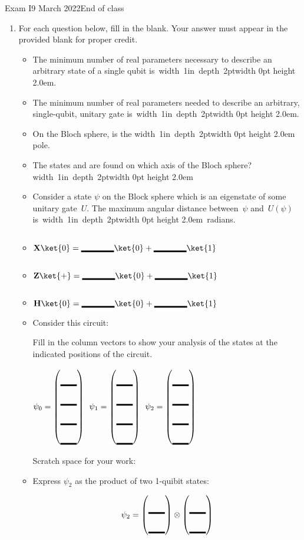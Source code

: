 \documentclass[12pt]{article}
\def\Gate#1{\textbf{#1}}
\def\X{\Gate{X}}
\def\Z{\Gate{Z}}
\def\H{\Gate{H}}
\def\QZero{\ket{0}}
\def\QState#1{\ensuremath{\psi_{#1}}}
\newcommand{\Blank}[1][1in]{\mbox{\vrule width #1 depth 2pt}\vrule width 0pt height 2.0em}
\def\BlQb{\mbox{\ensuremath{\Blank[4em]\ket{0}+\Blank[4em]\ket{1}}}}
\def\SQB#1#2{%
\ensuremath{%
\begin{pmatrix*}[r] #1 \\ #2\end{pmatrix*}}}
\def\SQBB{\SQB{\Blank[2em]}{\Blank[2em]}}
\def\DQB#1#2#3#4{%
\ensuremath{%
\begin{pmatrix*}[r] #1 \\ #2 \\ #3 \\ #4\end{pmatrix*}}}
\def\DQBB{\DQB{\Blank[2em]}{\Blank[2em]}{\Blank[2em]}{\Blank[2em]}}
\begin{document}
\begin{assignment}{Exam I}{9 March 2022}{End of class}
\begin{enumerate}
\item{} For each question below, fill in the blank.  Your answer must appear in the provided blank for proper credit.
\begin{itemize}
    \item The minimum number of real parameters necessary to describe an arbitrary state of a single qubit is~\Blank{}.
    \item The minimum number of real parameters needed to describe an arbitrary, single-qubit, unitary gate is~\Blank{}.
    \item On the Bloch sphere,  is the \Blank{} pole.
    \item The states \ket{+} and \ket{-} are found on which axis of the Bloch sphere? \Blank{}
    \item Consider a state $\psi$ on the Block sphere which is an eigenstate of some unitary gate~$U$.  The maximum angular distance between~$\psi$ and~$U(\psi)$ is~\Blank{}~radians.
    \item $\X\ket{0}=\BlQb$
    \item $\Z\ket{+}=\BlQb$
    \item $\H{\ket{0}}=\BlQb$
    \item Consider this circuit:
    
    \adjustbox{valign=t}{\begin{quantikz}
\lstick{\QZero{}}&\gate{X}\slice{\QState{0}} & \ctrl{1}\slice{\QState{1}} & \gate{H}\slice{\QState{1}}  & \qw\\
\lstick{\QZero{}} &\qw & \targ{} &  \qw    &  \qw
\end{quantikz}}

Fill in the column vectors to show your analysis of the states at the indicated positions of the circuit.

$\QState{0}=\DQBB{}$  $\QState{1}=\DQBB{}$  $\QState{2}=\DQBB{}$

Scratch space for your work:

\vskip 2in
\item Express \QState{2} as the product of two 1-quibit states:

\[\QState{2} = \SQBB \otimes \SQBB \]

\end{itemize}


\end{enumerate}
\end{assignment}
\end{document}
